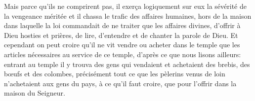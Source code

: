 Mais parce qu’ils ne comprirent pas,
	il exerça logiquement sur eux la sévérité de la vengeance méritée
	et il chassa le trafic des affaires humaines,
	hors de la maison
		dans laquelle la loi commandait de ne traiter que les affaires divines,
	d’offrir à Dieu hosties et prières,
	de lire, d’entendre et de chanter la parole de Dieu.
Et cependant on peut croire qu’il ne vit vendre ou acheter dans le temple
	que les articles nécessaires au service de ce temple,
	d’après ce que nous lisons ailleurs:
	entrant au temple il y trouva des gens
		qui vendaient et achetaient des brebis, des bœufs et des colombes,
	précisément tout ce que les pèlerins venus de loin
	n’achetaient aux gens du pays, à ce qu’il faut croire,
	que pour l’offrir dans la maison du Seigneur.
